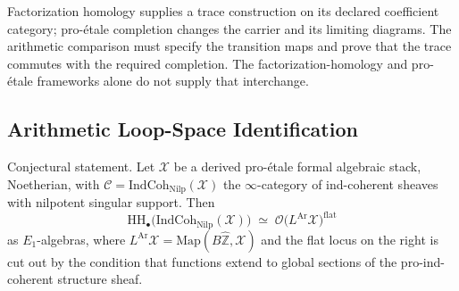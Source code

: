 \begin{remark}
\label{v4-arith:bzn:rem:arith-fact-homology-disjoint}
Factorization homology supplies a trace construction on its declared
coefficient category; pro-\'etale completion changes the carrier and
its limiting diagrams. The arithmetic comparison must specify the
transition maps and prove that the trace commutes with the required
completion. The factorization-homology and pro-\'etale frameworks
alone do not supply that interchange.
\end{remark}

\subsection{Arithmetic Loop-Space Identification}

\begin{theorem}
\label{v4-arith:bzn:thm:HH-IndCoh-arith}
Conjectural statement. Let \(\mathcal{X}\) be a derived pro-\'etale
formal algebraic stack, Noetherian, with
\(\mathcal{C}=\mathrm{IndCoh}_{\mathrm{Nilp}}(\mathcal{X})\) the
\(\infty\)-category of ind-coherent sheaves with nilpotent
singular support. Then
\begin{equation}
\label{v4-arith:bzn:eq:HH-IndCoh-arith}
\mathrm{HH}_{\bullet}\bigl(\mathrm{IndCoh}_{\mathrm{Nilp}}(\mathcal{X})\bigr)\;\simeq\;\mathcal{O}\bigl(L^{\mathrm{Ar}}\mathcal{X}\bigr)^{\mathrm{flat}}
\end{equation}
as \(E_{1}\)-algebras, where \(L^{\mathrm{Ar}}\mathcal{X}=\mathrm{Map}(B\widehat{\mathbb{Z}},\mathcal{X})\)
and the flat locus on the right is cut out by the condition that
functions extend to global sections of the pro-ind-coherent
structure sheaf.
\end{theorem}

